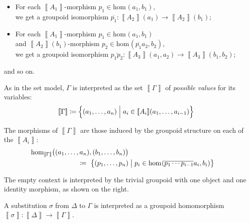 \documentclass{article}
\theoremstyle{definition}
\renewcommand{\int}[1]{\mathopen{}\left\llbracket #1
    \right\rrbracket\mathclose{}}       %
\renewcommand{\hom}[3][]{\mathrm{hom}_{#1}\mathopen{}\left( #2, #3 \right)\mathclose{}}
\newcommand{\gfunc}[1]{\overline{#1}}
\DeclareMathOperator{\id}{id}				    %
\newcommand{\defeq}{
	\mathrel{\mathrel{\mathop:}\mkern-1.2mu=}}	%
\newcommand{\n}{%
}                %
\begin{document}
\begin{itemize}
    \item For each $\int{A_1}$-morphism $p_1 \in \hom{a_1}{b_1}$,\\ we get a groupoid isomorphism $\gfunc{p_1}\colon \int{A_2}\n(a_1) \to \int{A_2}\n(b_1)$;
    
    \item For each $\int{A_1}$-morphism $p_1 \in \hom{a_1}{b_1}$\\ and $\int{A_2}\n(b_1)$-morphism $p_2 \in \hom{\gfunc{p_1} a_2}{b_2}$,\\ we get a groupoid isomorphism $\gfunc{p_1p_2}\colon \int{A_3}\n(a_1,a_2) \to \int{A_3}\n(b_1,b_2)$;
\end{itemize}
and so on.

As in the set model, $\Gamma$ is interpreted as the set $\int{\Gamma}$ of \textit{possible values} for its variables: $$\int{\Gamma} \defeq \Big\{ (a_1,\ldots,a_n) \mathrel{\Big|} a_i \in \int{A_i}\n(a_1,\ldots,a_{i-1}) \Big\}$$

The morphisms of $\int{\Gamma}$ are those induced by the groupoid structure on each of the $\int{A_i}$:
\begin{align*}
    \hom[\int{\Gamma}]{\big.(a_1,\ldots,a_n)}{(b_1,\ldots,b_n)}\\ \defeq\ \big\{ (p_1, \ldots, p_n)& \mathrel{\big|} p_i \in \hom{\gfunc{p_1 \cdots p_{i-1}} a_i}{b_i} \big\}
\end{align*}

\vspace{-2mm}
\begin{minipage}[b]{0.83\linewidth}
The empty context is interpreted by the trivial groupoid with one object and one identity morphism, as shown on the right.
\end{minipage}
\hfill
\begin{minipage}[b]{0.12\linewidth}
\end{minipage}


A substitution $\sigma$ from $\Delta$ to $\Gamma$ is interpreted as a groupoid homomorphism $\int{\sigma}\colon \int{\Delta} \to \int{\Gamma}$.
\end{document}
